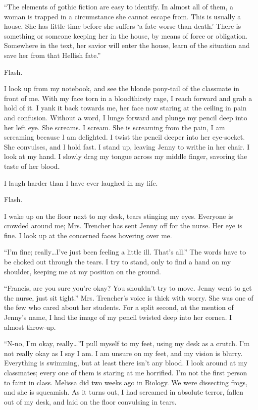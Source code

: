 ``The elements of gothic fiction are easy to identify. In
almost all of them, a woman is trapped in a circumstance she cannot
escape from. This is usually a house. She has little time before
she suffers `a fate worse than death.' There is
something or someone keeping her in the house, by means of force or
obligation. Somewhere in the text, her savior will enter the house,
learn of the situation and save her from that Hellish
fate.''



Flash.



I look up from my notebook, and see the blonde pony-tail of the
classmate in front of me. With my face torn in a bloodthirsty rage,
I reach forward and grab a hold of it. I yank it back towards me,
her face now staring at the ceiling in pain and confusion. Without
a word, I lunge forward and plunge my pencil deep into her left
eye. She screams. I scream. She is screaming from the pain, I am
screaming because I am delighted. I twist the pencil deeper into
her eye-socket. She convulses, and I hold fast. I stand up, leaving
Jenny to writhe in her chair. I look at my hand. I slowly drag my
tongue across my middle finger, savoring the taste of her
blood.

I laugh harder than I have ever laughed in my life.



Flash.



I wake up on the floor next to my desk, tears stinging my eyes.
Everyone is crowded around me; Mrs. Trencher has sent Jenny off for
the nurse. Her eye is fine. I look up at the concerned faces
hovering over me.

``I'm fine; really{\ldots}I've just been feeling a
little ill. That's all.'' The words have to be choked
out through the tears. I try to stand, only to find a hand on my
shoulder, keeping me at my position on the ground.

``Francis, are you sure you're okay? You shouldn't
try to move. Jenny went to get the nurse, just sit tight.''
Mrs. Trencher's voice is thick with worry. She was one of the
few who cared about her students. For a split second, at the
mention of Jenny's name, I had the image of my pencil twisted
deep into her cornea. I almost throw-up.

``N-no, I'm okay, really{\ldots}''I pull myself to
my feet, using my desk as a crutch. I'm not really okay as I
say I am. I am unsure on my feet, and my vision is blurry.
Everything is swimming, but at least there isn't any blood. I
look around at my classmates; every one of them is staring at me
horrified. I'm not the first person to faint in class.
Melissa did two weeks ago in Biology. We were dissecting frogs, and
she is squeamish. As it turns out, I had screamed in absolute
terror, fallen out of my desk, and laid on the floor convulsing in
tears.

